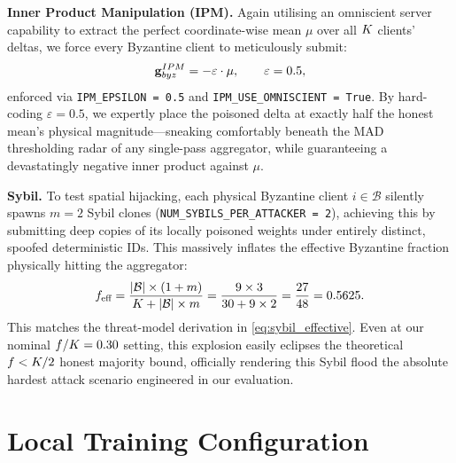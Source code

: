 \documentclass[../main.tex]{subfiles}
\begin{document}
\textbf{Inner Product Manipulation (IPM).}
Again utilising an omniscient server capability to extract the perfect coordinate-wise mean $\mu$ over all $K$ clients' deltas, we force every Byzantine client to meticulously submit:
\begin{equation}
    \mathbf{g}_{byz}^{IPM} = -\varepsilon \cdot \mu, \qquad \varepsilon = 0.5,
    \label{eq:ipm_impl}
\end{equation}
enforced via \texttt{IPM\_EPSILON = 0.5} and \texttt{IPM\_USE\_OMNISCIENT = True}. By hard-coding $\varepsilon = 0.5$, we expertly place the poisoned delta at exactly half the honest mean's physical magnitude---sneaking comfortably beneath the MAD thresholding radar of any single-pass aggregator, while guaranteeing a devastatingly negative inner product against $\mu$.

\textbf{Sybil.}
To test spatial hijacking, each physical Byzantine client $i \in \mathcal{B}$ silently spawns $m = 2$ Sybil clones (\texttt{NUM\_SYBILS\_PER\_ATTACKER = 2}), achieving this by submitting deep copies of its locally poisoned weights under entirely distinct, spoofed deterministic IDs. This massively inflates the effective Byzantine fraction physically hitting the aggregator:
\begin{equation}
    f_{\text{eff}} = \frac{|\mathcal{B}| \times (1 + m)}{K + |\mathcal{B}| \times m} = \frac{9 \times 3}{30 + 9 \times 2} = \frac{27}{48} = 0.5625.
    \label{eq:sybil_effective_frac}
\end{equation}
This matches the threat-model derivation in \cref{eq:sybil_effective}. Even at our nominal $f/K = 0.30$ setting, this explosion easily eclipses the theoretical $f < K/2$ honest majority bound, officially rendering this Sybil flood the absolute hardest attack scenario engineered in our evaluation.

\section{Local Training Configuration}
\label{sec:exp_local_training}
\end{document}
